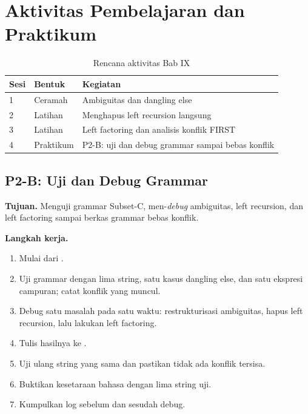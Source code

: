 \section*{Aktivitas Pembelajaran dan Praktikum}

\begin{table}[H]
\centering
\caption{Rencana aktivitas Bab IX}
\label{tab:ch09-aktivitas}
\begin{tabularx}{\textwidth}{@{}llX@{}}
\toprule
\textbf{Sesi} & \textbf{Bentuk} & \textbf{Kegiatan} \\
\midrule
1 & Ceramah & Ambiguitas dan dangling else \\
2 & Latihan & Menghapus left recursion langsung \\
3 & Latihan & Left factoring dan analisis konflik FIRST \\
4 & Praktikum & P2-B: uji dan debug grammar sampai bebas konflik \\
\bottomrule
\end{tabularx}
\end{table}

\subsection*{P2-B: Uji dan Debug Grammar}
\textbf{Tujuan.} Menguji grammar Subset-C, men-\textit{debug}
ambiguitas, left recursion, dan left factoring sampai berkas grammar
bebas konflik.

\textbf{Langkah kerja.}
\begin{enumerate}[label=\arabic*.,leftmargin=*]
  \item Mulai dari .
  \item Uji grammar dengan lima string, satu kasus dangling else, dan
        satu ekspresi campuran; catat konflik yang muncul.
  \item Debug satu masalah pada satu waktu: restrukturisasi ambiguitas,
        hapus left recursion, lalu lakukan left factoring.
  \item Tulis hasilnya ke .
  \item Uji ulang string yang sama dan pastikan tidak ada konflik
        tersisa.
  \item Buktikan kesetaraan bahasa dengan lima string uji.
  \item Kumpulkan log sebelum dan sesudah debug.
\end{enumerate}

